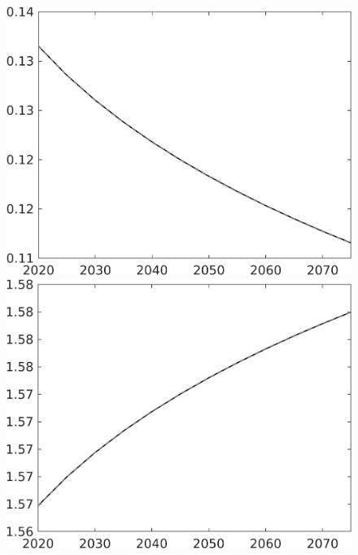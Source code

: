 \documentclass[12pt]{article}
\begin{document}
\begin{figure}[h!!]
\begin{minipage}[]{0.32\textwidth}
	\end{minipage}	
	\begin{minipage}[]{0.32\textwidth}
		\includegraphics[width=1\textwidth]{../../codding_model/own_basedOnFried/optimalPol_010922_revision/figures/all_13Sept22/CompTaul_LFBAU_Reg0_pee_spillover0_nsk0_xgr1_knspil0_sep1_countec0_GovRev0_etaa0.79_lgd0.png}
	\end{minipage}	
	\begin{minipage}[]{0.32\textwidth}
		\includegraphics[width=1\textwidth]{../../codding_model/own_basedOnFried/optimalPol_010922_revision/figures/all_13Sept22/CompTaul_LFBAU_Reg0_pn_spillover0_nsk0_xgr1_knspil0_sep1_countec0_GovRev0_etaa0.79_lgd0.png}

\end{minipage}
\end{figure}
\end{document}

